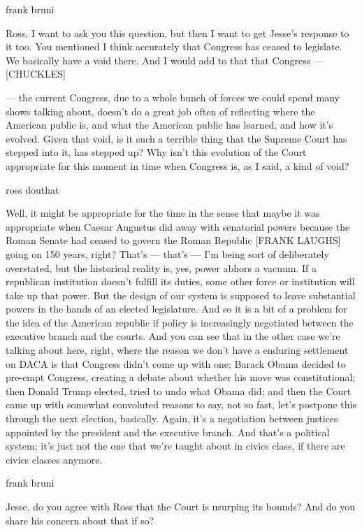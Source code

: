 frank bruni

Ross, I want to ask you this question, but then I want to get Jesse's
response to it too. You mentioned I think accurately that Congress has
ceased to legislate. We basically have a void there. And I would add to
that that Congress --- {[}CHUCKLES{]}

--- the current Congress, due to a whole bunch of forces we could spend
many shows talking about, doesn't do a great job often of reflecting
where the American public is, and what the American public has learned,
and how it's evolved. Given that void, is it such a terrible thing that
the Supreme Court has stepped into it, has stepped up? Why isn't this
evolution of the Court appropriate for this moment in time when Congress
is, as I said, a kind of void?

ross douthat

Well, it might be appropriate for the time in the sense that maybe it
was appropriate when Caesar Augustus did away with senatorial powers
because the Roman Senate had ceased to govern the Roman Republic
{[}FRANK LAUGHS{]} going on 150 years, right? That's --- that's --- I'm
being sort of deliberately overstated, but the historical reality is,
yes, power abhors a vacuum. If a republican institution doesn't fulfill
its duties, some other force or institution will take up that power. But
the design of our system is supposed to leave substantial powers in the
hands of an elected legislature. And so it is a bit of a problem for the
idea of the American republic if policy is increasingly negotiated
between the executive branch and the courts. And you can see that in the
other case we're talking about here, right, where the reason we don't
have a enduring settlement on DACA is that Congress didn't come up with
one; Barack Obama decided to pre-empt Congress, creating a debate about
whether his move was constitutional; then Donald Trump elected, tried to
undo what Obama did; and then the Court came up with somewhat convoluted
reasons to say, not so fast, let's postpone this through the next
election, basically. Again, it's a negotiation between justices
appointed by the president and the executive branch. And that's a
political system; it's just not the one that we're taught about in
civics class, if there are civics classes anymore.

frank bruni

Jesse, do you agree with Ross that the Court is usurping its bounds? And
do you share his concern about that if so?

